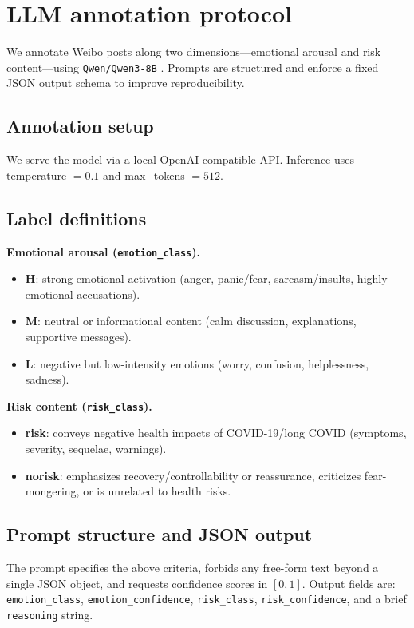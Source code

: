 \documentclass[11pt]{article}
\begin{document}
\section{LLM annotation protocol}
\label{supp:s1-llm}

We annotate Weibo posts along two dimensions---emotional arousal and risk content---using \texttt{Qwen/Qwen3-8B} \citep{Qwen3_8B}. Prompts are structured and enforce a fixed JSON output schema to improve reproducibility.

\subsection{Annotation setup}
We serve the model via a local OpenAI-compatible API. Inference uses temperature $=0.1$ and max\_tokens $=512$.

\subsection{Label definitions}
\noindent\textbf{Emotional arousal (\texttt{emotion\_class}).}
\begin{itemize}
  \item \textbf{H}: strong emotional activation (anger, panic/fear, sarcasm/insults, highly emotional accusations).
  \item \textbf{M}: neutral or informational content (calm discussion, explanations, supportive messages).
  \item \textbf{L}: negative but low-intensity emotions (worry, confusion, helplessness, sadness).
\end{itemize}

\noindent\textbf{Risk content (\texttt{risk\_class}).}
\begin{itemize}
  \item \textbf{risk}: conveys negative health impacts of COVID-19/long COVID (symptoms, severity, sequelae, warnings).
  \item \textbf{norisk}: emphasizes recovery/controllability or reassurance, criticizes fear-mongering, or is unrelated to health risks.
\end{itemize}

\subsection{Prompt structure and JSON output}
The prompt specifies the above criteria, forbids any free-form text beyond a single JSON object, and requests confidence scores in $[0,1]$. Output fields are:
\texttt{emotion\_class}, \texttt{emotion\_confidence}, \texttt{risk\_class}, \texttt{risk\_confidence}, and a brief \texttt{reasoning} string.
\end{document}
